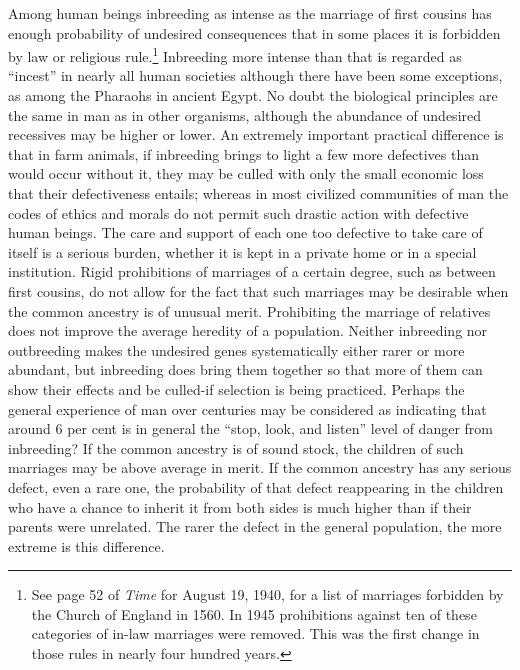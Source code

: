 Among human beings inbreeding as intense as the marriage of first
cousins has enough probability of undesired consequences that in some
places it is forbidden by law or religious rule.\footnote{See page 52
of \textit{Time} for August 19, 1940, for a list of marriages forbidden by the
Church of England in 1560. In 1945 prohibitions against ten of these categories of
in-law marriages were removed. This was the first change in those rules in nearly
four hundred years.} Inbreeding more intense
than that is regarded as ``incest'' in nearly all human societies although
there have been some exceptions, as among the Pharaohs in ancient
Egypt. No doubt the biological principles are the same in man as in
other organisms, although the abundance of undesired recessives may
be higher or lower. An extremely important practical difference is that
in farm animals, if inbreeding brings to light a few more defectives
than would occur without it, they may be culled with only the small
economic loss that their defectiveness entails; whereas in most civilized
communities of man the codes of ethics and morals do not permit such
drastic action with defective human beings. The care and support of
each one too defective to take care of itself is a serious burden, whether
it is kept in a private home or in a special institution. Rigid prohibitions
of marriages of a certain degree, such as between first cousins, do
not allow for the fact that such marriages may be desirable when the
common ancestry is of unusual merit. Prohibiting the marriage of relatives
does not improve the average heredity of a population. Neither
inbreeding nor outbreeding makes the undesired genes systematically
either rarer or more abundant, but inbreeding does bring them together
so that more of them can show their effects and be culled-if selection
is being practiced. Perhaps the general experience of man over centuries
may be considered as indicating that around 6 per cent is in general
the ``stop, look, and listen'' level of danger from inbreeding? If the
common ancestry is of sound stock, the children of such marriages may
be above average in merit. If the common ancestry has any serious
defect, even a rare one, the probability of that defect reappearing in the
children who have a chance to inherit it from both sides is much higher
than if their parents were unrelated. The rarer the defect in the general
population, the more extreme is this difference.

